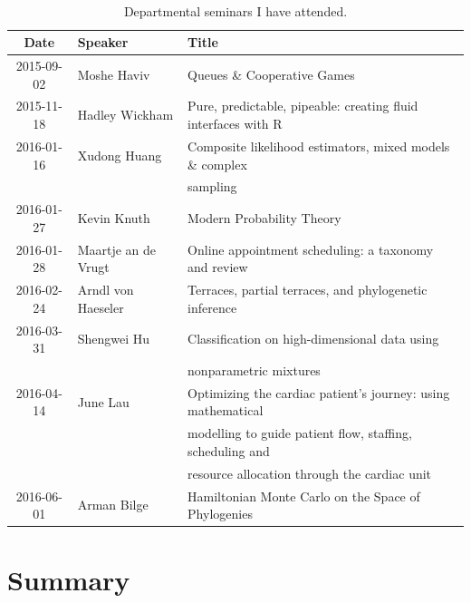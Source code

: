 \documentclass[12pt,a4paper]{article}
\begin{document}
\begin{table}[hh]
\caption{
Departmental seminars I have attended.%
}
\centering
\ ~~~~ \\
\label{tab:seminars}
\begin{tabular}{cll}
\toprule
Date & Speaker & Title \\
\midrule
2015-09-02 & Moshe Haviv &
Queues \& Cooperative Games \\
%
2015-11-18 & Hadley Wickham &
Pure, predictable, pipeable: creating fluid interfaces with R \\
%
2016-01-16 & Xudong Huang &
Composite likelihood estimators, mixed models \& complex \\
&&sampling \\
%
2016-01-27 & Kevin Knuth &
Modern Probability Theory \\
%
2016-01-28 & Maartje an de Vrugt &
Online appointment scheduling: a taxonomy and review \\
%
2016-02-24 & Arndl von Haeseler &
Terraces, partial terraces, and phylogenetic inference \\
%
2016-03-31 & Shengwei Hu &
Classification on high-dimensional data using\\&&nonparametric mixtures \\
%
2016-04-14 & June Lau &
Optimizing the cardiac patient's journey: using mathematical \\
&&modelling to guide patient flow, staffing, scheduling and \\
&&resource allocation through the cardiac unit \\
%
2016-06-01 & Arman Bilge &
Hamiltonian Monte Carlo on the Space of Phylogenies \\
%
%
\bottomrule
\end{tabular}
\end{table}




\section{Summary}
\end{document}
